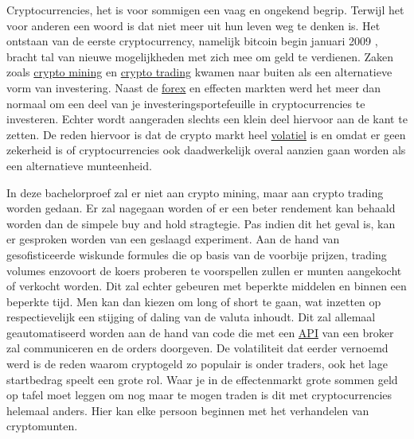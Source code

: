 Cryptocurrencies, het is voor sommigen een vaag en ongekend begrip. Terwijl het voor anderen een woord is dat niet meer uit hun leven weg te denken is. Het ontstaan van de eerste cryptocurrency, namelijk bitcoin begin januari 2009 \autocite{}, bracht tal van nieuwe mogelijkheden met zich mee om geld te verdienen. Zaken zoals
\underline{crypto mining} en \underline{crypto trading} kwamen naar buiten als een alternatieve vorm van investering. Naast de \underline{forex} en effecten markten werd het meer dan normaal om een deel van je investeringsportefeuille in cryptocurrencies te investeren. Echter wordt aangeraden slechts een klein deel hiervoor aan de kant te zetten. De reden hiervoor is dat de crypto markt heel \underline{volatiel} is en omdat er geen zekerheid is of cryptocurrencies ook daadwerkelijk overal aanzien gaan worden als een alternatieve munteenheid.

In deze bachelorproef zal er niet aan crypto mining, maar aan crypto trading worden gedaan. Er zal nagegaan worden of er een beter rendement kan behaald worden dan de simpele buy and hold stragtegie. Pas indien dit het geval is, kan er gesproken worden van een geslaagd experiment. Aan de hand van gesofisticeerde wiskunde formules die op basis van de voorbije prijzen, trading volumes enzovoort de koers proberen te voorspellen zullen er munten aangekocht of verkocht worden. Dit zal echter gebeuren met beperkte middelen en binnen een beperkte tijd. Men kan dan kiezen om long of short te gaan, wat inzetten op respectievelijk een stijging of daling van de valuta inhoudt. Dit zal allemaal geautomatiseerd worden aan de hand van code die met een \underline{API} van een broker zal communiceren en de orders doorgeven. De volatiliteit dat eerder vernoemd werd is de reden waarom cryptogeld zo populair is onder traders, ook het lage startbedrag speelt een grote rol. Waar je in de effectenmarkt grote sommen geld op tafel moet leggen om nog maar te mogen traden is dit met cryptocurrencies helemaal anders. Hier kan elke persoon beginnen met het verhandelen van cryptomunten.






